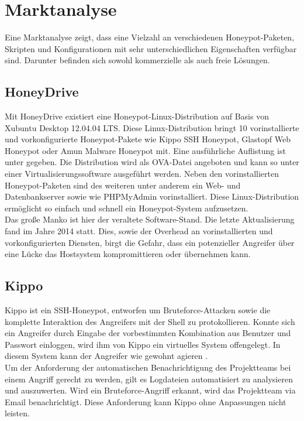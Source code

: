 \chapter{Marktanalyse}
\label{ch:Marktanalyse}

Eine Marktanalyse zeigt, dass eine Vielzahl an verschiedenen Honeypot-Paketen, Skripten und Konfigurationen mit sehr unterschiedlichen Eigenschaften verfügbar sind. Darunter befinden sich sowohl kommerzielle als auch freie Lösungen.

\section{HoneyDrive}
\label{sec:HoneyDrive}
Mit HoneyDrive existiert eine Honeypot-Linux-Distribution auf Basis von Xubuntu Desktop 12.04.04 LTS. Diese Linux-Distribution bringt 10 vorinstallierte und vorkonfigurierte Honeypot-Pakete wie Kippo SSH Honeypot, Glastopf Web Honeypot oder Amun Malware Honeypot mit. Eine ausführliche Auflistung ist unter \cite{honeydrive16} gegeben. Die Distribution wird als OVA-Datei angeboten und kann so unter einer Virtualisierungssoftware ausgeführt werden. Neben den vorinstallierten Honeypot-Paketen sind des weiteren unter anderem ein Web- und Datenbankserver sowie wie PHPMyAdmin vorinstalliert.
Diese Linux-Distribution ermöglicht so einfach und schnell ein Honeypot-System aufzusetzen.\\

Das große Manko ist hier der veraltete Software-Stand. Die letzte Aktualisierung fand im Jahre 2014 statt. Dies, sowie der Overhead an vorinstallierten und vorkonfigurierten Diensten, birgt die Gefahr, dass ein potenzieller Angreifer über eine Lücke das Hostsystem kompromittieren oder übernehmen kann.

\section{Kippo}
\label{sec:Kippo}
Kippo ist ein SSH-Honeypot, entworfen um Bruteforce-Attacken sowie die komplette Interaktion des Angreifers mit der Shell zu protokollieren. Konnte sich ein Angreifer durch Eingabe der vorbestimmten Kombination aus Benutzer und Passwort einloggen, wird ihm von Kippo ein virtuelles System offengelegt. In diesem System kann der Angreifer wie gewohnt agieren \cite{Kippo16}.\\
Um der Anforderung der automatischen Benachrichtigung des Projektteams bei einem Angriff gerecht zu werden, gilt es Logdateien automatisiert zu analysieren und auszuwerten. Wird ein Bruteforce-Angriff erkannt, wird das Projektteam via Email benachrichtigt. Diese Anforderung kann Kippo ohne Anpassungen nicht leisten.\\


